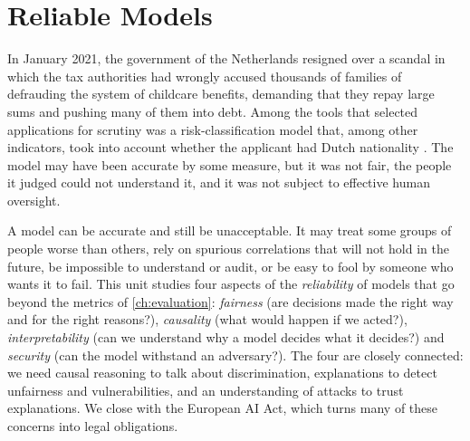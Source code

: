 \chapter{Reliable Models}\label{ch:reliable}

In January 2021, the government of the Netherlands resigned over a scandal in which the tax authorities had
wrongly accused thousands of families of defrauding the system of childcare benefits, demanding that they repay
large sums and pushing many of them into debt. Among the tools that selected applications for scrutiny was a
risk-classification model that, among other indicators, took into account whether the applicant had Dutch
nationality \citep{amnesty2021xenophobic}. The model may have been accurate by some measure, but it was not
fair, the people it judged could not understand it, and it was not subject to effective human oversight.

A model can be accurate and still be unacceptable. It may treat some groups of people worse
than others, rely on spurious correlations that will not hold in the future, be impossible to
understand or audit, or be easy to fool by someone who wants it to fail. This unit studies four
aspects of the \emph{reliability} of models that go beyond the metrics of \cref{ch:evaluation}:
\emph{fairness} (are decisions made the right way and for the right reasons?), \emph{causality}
(what would happen if we acted?), \emph{interpretability} (can we understand why a model
decides what it decides?) and \emph{security} (can the model withstand an adversary?). The four
are closely connected: we need causal reasoning to talk about discrimination, explanations to
detect unfairness and vulnerabilities, and an understanding of attacks to trust explanations. We close with
the European AI Act, which turns many of these concerns into legal obligations.


